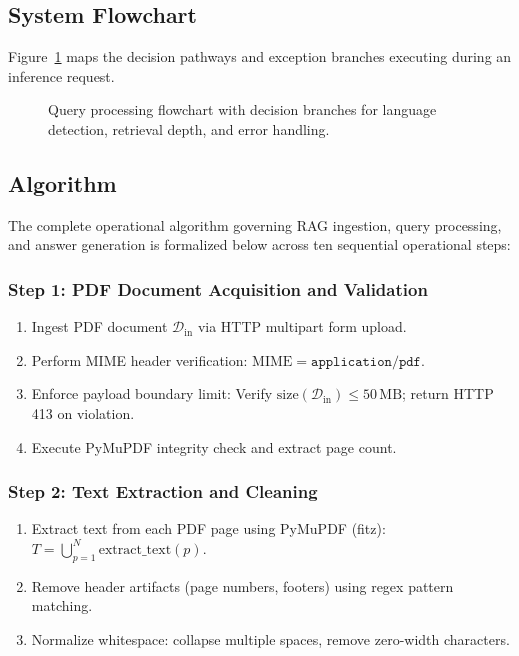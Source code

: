 \documentclass[12pt,a4paper]{report}
\begin{document}
\subsection{System Flowchart}
Figure~\ref{fig:multiagent_flowchart} maps the decision pathways and exception branches executing during an inference request.

\begin{figure}[H]
    \centering
    \caption{Query processing flowchart with decision branches for language detection, retrieval depth, and error handling.}
    \label{fig:multiagent_flowchart}
\end{figure}

\subsection{Algorithm}
The complete operational algorithm governing RAG ingestion, query processing, and answer generation is formalized below across ten sequential operational steps:

\subsubsection*{Step 1: PDF Document Acquisition and Validation}
\begin{enumerate}
  \item[\textbf{1.1}] Ingest PDF document $\mathcal{D}_{\text{in}}$ via HTTP multipart form upload.
  \item[\textbf{1.2}] Perform MIME header verification: $\mathrm{MIME} = \texttt{application/pdf}$.
  \item[\textbf{1.3}] Enforce payload boundary limit: Verify $\mathrm{size}(\mathcal{D}_{\text{in}}) \le 50\,\mathrm{MB}$; return HTTP 413 on violation.
  \item[\textbf{1.4}] Execute PyMuPDF integrity check and extract page count.
\end{enumerate}

\subsubsection*{Step 2: Text Extraction and Cleaning}
\begin{enumerate}
  \item[\textbf{2.1}] Extract text from each PDF page using PyMuPDF (fitz): $T = \bigcup_{p=1}^{N} \text{extract\_text}(p)$.
  \item[\textbf{2.2}] Remove header artifacts (page numbers, footers) using regex pattern matching.
  \item[\textbf{2.3}] Normalize whitespace: collapse multiple spaces, remove zero-width characters.
\end{enumerate}
\end{document}
